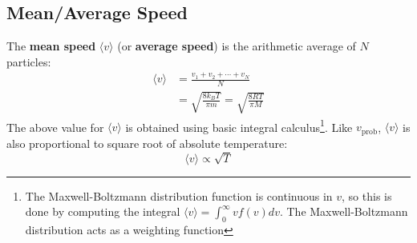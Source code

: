 \subsection{Mean/Average Speed}
%  
%    
The \textbf{mean speed} $\langle v\rangle$ (or \textbf{average speed}) is
the arithmetic average of $N$ particles:
\begin{align*}
  \langle v\rangle &=\frac{v_1+v_2+\cdots+v_N}N\\
  &=\sqrt{\frac{8k_BT}{\pi m}}=\sqrt{\frac{8RT}{\pi M}}
\end{align*}
The above value for $\langle v\rangle$ is obtained using basic integral
calculus\footnote{The Maxwell-Boltzmann distribution function is continuous
in $v$, so this is done by computing the integral
$\langle v\rangle=\int_0^\infty vf(v)dv$. The Maxwell-Boltzmann distribution
acts as a weighting function}. Like $v_\text{prob}$, $\langle v\rangle$ is
also proportional to square root of absolute temperature:
\begin{equation}
  \langle v\rangle\propto\sqrt T
\end{equation}
%
%
%
